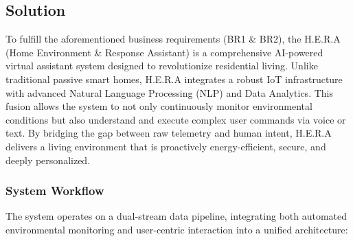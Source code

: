 \subsection{Solution}
To fulfill the aforementioned business requirements (BR1 \& BR2), the H.E.R.A (Home Environment \& Response Assistant) is a comprehensive AI-powered virtual assistant system designed to revolutionize residential living. Unlike traditional passive smart homes, H.E.R.A integrates a robust IoT infrastructure with advanced Natural Language Processing (NLP) and Data Analytics. This fusion allows the system to not only continuously monitor environmental conditions but also understand and execute complex user commands via voice or text. By bridging the gap between raw telemetry and human intent, H.E.R.A delivers a living environment that is proactively energy-efficient, secure, and deeply personalized.

\subsubsection*{System Workflow} 
The system operates on a dual-stream data pipeline, integrating both automated environmental monitoring and user-centric interaction into a unified architecture:

